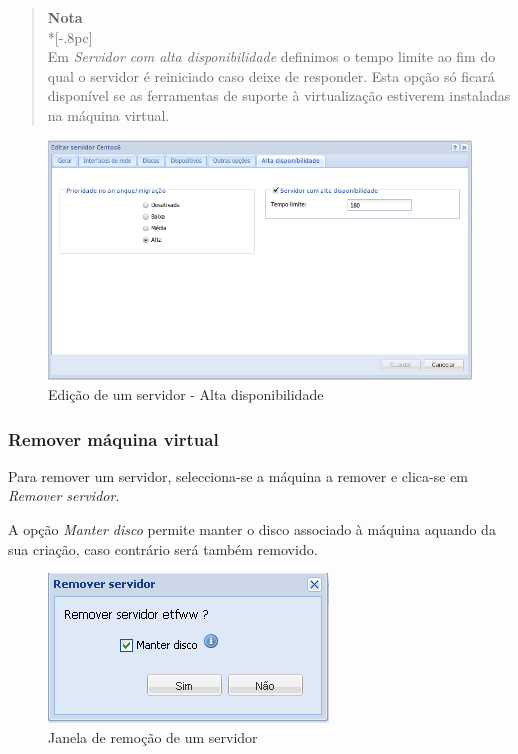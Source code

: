 \begin{description}
                \begin{quote}
                    {\large \bf Nota} \\*[-.8pc]
                    \underline{\hspace{6in}} \\
                    Em \emph{Servidor com alta disponibilidade} definimos o tempo limite ao fim do qual
                        o servidor é reiniciado caso deixe de responder.
                    Esta opção só ficará disponível se as ferramentas de suporte à virtualização estiverem instaladas na máquina virtual.
                \end{quote}
                    
		\begin{figure}[H]
        		\begin{center}
		        \includegraphics[scale=0.5]{screenshots/server_edit_ha.png}
        		\caption{Edição de um servidor - Alta disponibilidade}
	        	\label{fig:server_edit_ha}
	        	\end{center}
		\end{figure}

\end{description}


\subsubsection{Remover máquina virtual}
\label{sec:remove_server}
Para remover um servidor, selecciona-se a máquina a remover e clica-se em \emph{Remover servidor}.

A opção \emph{Manter disco} permite manter o disco associado à máquina aquando da sua criação, caso contrário será também removido.
		
\begin{figure}[H]
	\begin{center}
	\includegraphics[scale=0.5]{screenshots/server_remove.png}
	\caption{Janela de remoção de um servidor}
	\label{fig:server_remove}
	\end{center}
\end{figure}

